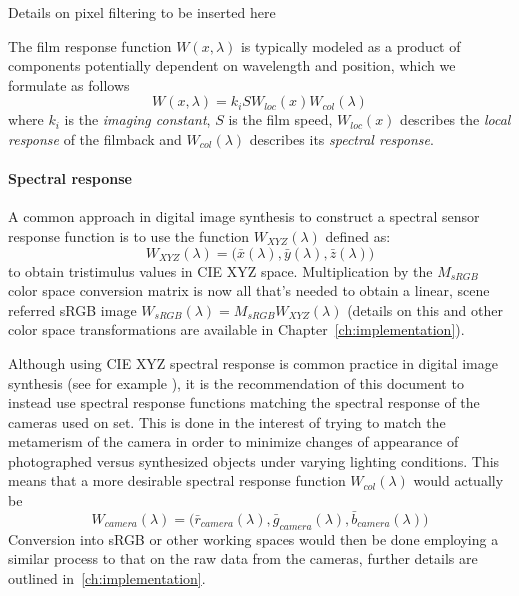 \begin{inconstruction}
 Details on pixel filtering to be inserted here
\end{inconstruction}

The film response function $W(x, \lambda)$ is typically modeled as a product of
components potentially dependent on wavelength and position, which we formulate
as follows
\begin{equation}
W(x,\lambda) = k_i S W_{loc}(x) W_{col}(\lambda)
\end{equation}
where $k_i$ is the \textsl{imaging constant}, $S$ is the film speed,
$W_{loc}(x)$ describes the \textsl{local response} of the filmback and
$W_{col}(\lambda)$ describes its \textsl{spectral response}.

\paragraph{Spectral response}
A common approach in digital image synthesis to construct a spectral sensor
response function is to use the function $W_{XYZ}(\lambda)$ defined as:
\begin{equation}
W_{XYZ}(\lambda) = \big(\bar x(\lambda), \bar y (\lambda), \bar z(\lambda)\big)
\end{equation}
to obtain tristimulus values in \gls{CIE} \gls{XYZ} space.
Multiplication by the $M_{sRGB}$ color space conversion matrix is now all
that's needed to obtain a linear, scene referred \gls{sRGB} image
$W_{sRGB}(\lambda) = M_{sRGB} W_{XYZ}(\lambda)$
(details on this and other color space transformations are available in
Chapter~\ref{ch:implementation}).

Although using \gls{CIE} \gls{XYZ} spectral response is common practice
in digital image synthesis (see for example \cite{pharr2010, jakob2010,
ward1994}), it is the recommendation of this document to instead use spectral
response functions matching the spectral response of the cameras used on set.
This is done in the interest of trying to match the metamerism of the camera in
order to minimize changes of appearance of photographed versus synthesized
objects under varying lighting conditions. This means that a more desirable
spectral response function $W_{col}(\lambda)$ would actually be
\begin{equation}
W_{camera}(\lambda) = \big(\bar r_{camera}(\lambda), \bar g_{camera}(\lambda),
\bar b_{camera}(\lambda)\big)
\end{equation}
Conversion into \gls{sRGB} or other working spaces would then be done employing
a similar process to that on the raw data from the cameras, further details are
outlined in~\cref{ch:implementation}.


